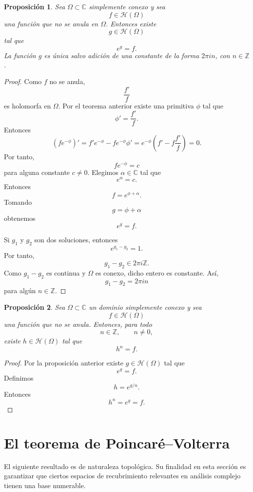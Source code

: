 \documentclass[11pt,a4paper]{article}
\theoremstyle{definition}
\theoremstyle{plain}
\newtheorem{proposicion}{Proposición}[section]
\theoremstyle{remark}
\newcommand{\C}{\mathbb C}
\newcommand{\Z}{\mathbb Z}
\newcommand{\Hol}{\mathcal H}
\begin{document}
\begin{proposicion}
Sea $\Omega\subset\C$ simplemente conexo y sea
\[
f\in\Hol(\Omega)
\]
una función que no se anula en $\Omega$. Entonces existe
\[
g\in\Hol(\Omega)
\]
tal que
\[
e^{g}=f.
\]
La función $g$ es única salvo adición de una constante de la forma
$2\pi i n$, con $n\in\Z$.
\end{proposicion}

\begin{proof}
Como $f$ no se anula,
\[
\frac{f'}{f}
\]
es holomorfa en $\Omega$. Por el teorema anterior existe una primitiva
$\phi$ tal que
\[
\phi'=\frac{f'}{f}.
\]
Entonces
\[
\left(fe^{-\phi}\right)'
=
f'e^{-\phi}-fe^{-\phi}\phi'
=
e^{-\phi}\left(f'-f\frac{f'}{f}\right)
=
0.
\]
Por tanto,
\[
fe^{-\phi}=c
\]
para alguna constante $c\neq0$. Elegimos $\alpha\in\C$ tal que
\[
e^\alpha=c.
\]
Entonces
\[
f=e^{\phi+\alpha}.
\]
Tomando
\[
g=\phi+\alpha
\]
obtenemos
\[
e^g=f.
\]

Si $g_1$ y $g_2$ son dos soluciones, entonces
\[
e^{g_1-g_2}=1.
\]
Por tanto,
\[
g_1-g_2\in2\pi i\Z.
\]
Como $g_1-g_2$ es continua y $\Omega$ es conexo, dicho entero es
constante. Así,
\[
g_1-g_2=2\pi i n
\]
para algún $n\in\Z$.
\end{proof}

\begin{proposicion}
Sea $\Omega\subset\C$ un dominio simplemente conexo y sea
\[
f\in\Hol(\Omega)
\]
una función que no se anula. Entonces, para todo
\[
n\in\Z,\qquad n\neq0,
\]
existe $h\in\Hol(\Omega)$ tal que
\[
h^n=f.
\]
\end{proposicion}

\begin{proof}
Por la proposición anterior existe $g\in\Hol(\Omega)$ tal que
\[
e^g=f.
\]
Definimos
\[
h=e^{g/n}.
\]
Entonces
\[
h^n
=
e^g
=
f.
\]
\end{proof}

\section{El teorema de Poincaré--Volterra}

El siguiente resultado es de naturaleza topológica. Su finalidad en
esta sección es garantizar que ciertos espacios de recubrimiento
relevantes en análisis complejo tienen una base numerable.
\end{document}
